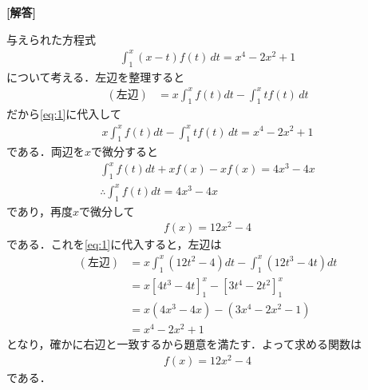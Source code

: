 \documentclass[../../main.tex]{subfiles}
\begin{document}
\begin{oframed}
  
\end{oframed}

{\bf [解答]}

与えられた方程式
\begin{align}
  \int_1^x (x - t) f(t) \, dt = x^4 - 2x^2 + 1 \label{eq:1}
\end{align}
について考える．左辺を整理すると
\begin{align}
  (\text{左辺})
  &= x \int_1^x f(t)dt - \int_1^x tf(t) \, dt
\end{align}
だから\cref{eq:1}に代入して
\begin{align}
  x \int_1^x f(t)dt - \int_1^x tf(t) \, dt = x^4 - 2x^2 + 1 \label{eq:2}
\end{align}
である．両辺を$x$で微分すると
\begin{align}
  \int_1^x f(t)dt + xf(x) - xf(x) = 4x^3-4x \\
  \therefore
  \int_1^x f(t)dt = 4x^3-4x
\end{align}
であり，再度$x$で微分して
\begin{align}
  f(x) = 12x^2 -4
\end{align}
である．これを\cref{eq:1}に代入すると，左辺は
\begin{align}
  (\text{左辺})
  &= x\int_1^x(12t^2-4)dt - \int_1^x(12t^3-4t)dt \\
  &= x\left[4t^3-4t\right]_{1}^{x} - \left[3t^4-2t^2\right]_{1}^{x} \\
  &= x(4x^3-4x) - (3x^4-2x^2-1) \\
  &= x^4 -2x^2 + 1
\end{align}
となり，確かに右辺と一致するから題意を満たす．よって求める関数は
\begin{align}
  f(x) = 12x^2 -4
\end{align}
である．
\end{document}
